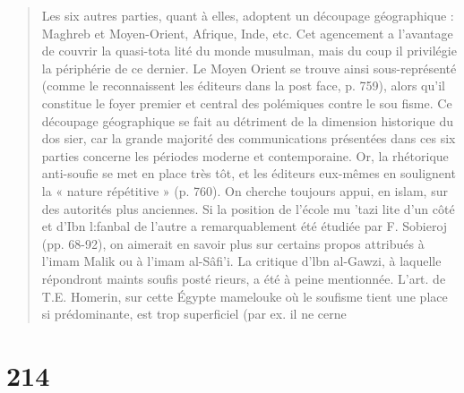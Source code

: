 \begin{quote}
Les six autres parties, quant à elles, adoptent un découpage
géographique : Maghreb et Moyen-Orient, Afrique, Inde, etc. Cet
agencement a l'avantage de couvrir la quasi-tota­ lité du monde
musulman, mais du coup il privilégie la périphérie de ce dernier. Le
Moyen Orient se trouve ainsi sous-représenté (comme le reconnaissent les
éditeurs dans la post­ face, p. 759), alors qu'il constitue le foyer
premier et central des polémiques contre le sou­ fisme. Ce découpage
géographique se fait au détriment de la dimension historique du dos­
sier, car la grande majorité des communications présentées dans ces six
parties concerne les périodes moderne et contemporaine. Or, la
rhétorique anti-soufie se met en place très tôt, et les éditeurs
eux-mêmes en soulignent la « nature répétitive » (p. 760). On cherche
toujours appui, en islam, sur des autorités plus anciennes. Si la
position de l'école mu 'tazi­ lite d'un côté et d'Ibn l:fanbal de
l'autre a remarquablement été étudiée par F. Sobieroj (pp. 68-92), on
aimerait en savoir plus sur certains propos attribués à l'imam Malik ou
à l'imam al-Sâfi'i. La critique d'lbn al-Gawzi, à laquelle répondront
maints soufis posté­ rieurs, a été à peine mentionnée. L'art. de T.E.
Homerin, sur cette Égypte mamelouke où le soufisme tient une place si
prédominante, est trop superficiel (par ex. il ne cerne
\end{quote}

\hypertarget{section}{%
\section{214}\label{section}}

